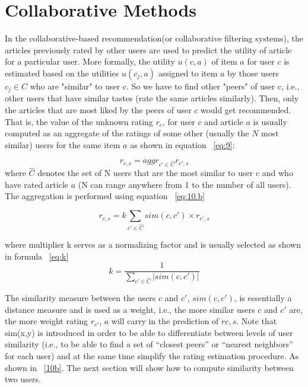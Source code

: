 \section{Collaborative Methods}\label{sec:coll}
In the collaborative-based recommendation(or collaborative filtering systems), the articles previously rated by other users are used to predict the utility of article for a particular user. More formally, the utility $u(c, a)$ of item $a$ for user $c$ is estimated based on the utilities $u(c_j, a)$ assigned to item $a$ by those users $c_j \in C$ who are "similar" to user c. So we have to find other "peers" of user c, i.e., other users that have similar tastes (rate the same articles similarly). Then, only the articles that are most liked by the peers of user $c$ would get recommended. 
That is, the value of the unknown rating $r_c$, for user c and article $a$ is usually computed as an aggregate of the ratings of some other (usually the $N$ most similar) users for the same item $a$ as shown in equation ~\ref{eq:9}:

\begin{equation}\label{eq:9}
r_{c,s}=aggr_{c'\in \hat{C}} r_{c',s} 
\end{equation}
where $\hat{C}$ denotes the set of N users that are the most similar to user c and who have rated article $a$ (N can range anywhere from 1 to the number of all users). The aggregation is performed using equation ~\ref{eq:10.b}


\begin{equation}\label{eq:10.b}
r_{c,s}= k\sum_{ c'\in \hat{C}} sim(c,c')\times r_{c',s}
\end{equation}


where multiplier k serves as a normalizing factor and is usually selected as shown in formula ~\ref{eq:k}
\begin{equation}\label{eq:k}
k = \frac{1}{\sum_{c' \in \hat{C}} |sim(c,c')|}
\end{equation}

The similarity measure between the users $c$ and $c'$, $sim(c, c')$, is essentially a distance measure and is used as a weight, i.e., the more similar users $c$ and $c'$ are, the more weight rating $r_{c'}$, $a$ will carry in the prediction of $r{c,s}$. Note that sim(x,y) is introduced in order to be able to differentiate between levels of user similarity (i.e., to be able to find a set of “closest peers” or “nearest neighbors” for each user) and at the same time simplify the rating estimation procedure. As shown in ~\ref{10b}. The next section will show how to compute similarity between two users.





